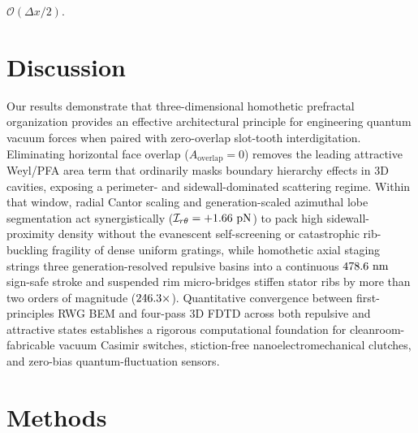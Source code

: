 \documentclass[pdflatex,sn-nature]{sn-jnl}
\begin{document}
$\mathcal{O}(\Delta x/2)$.

\section*{Discussion}
\label{sec:discussion}

Our results demonstrate that three-dimensional homothetic prefractal organization provides an effective architectural principle for engineering quantum vacuum forces when paired with zero-overlap slot-tooth interdigitation. Eliminating horizontal face overlap ($A_{\mathrm{overlap}}=0$) removes the leading attractive Weyl/PFA area term that ordinarily masks boundary hierarchy effects in 3D cavities\cite{kennethklich2006,lapidus1991}, exposing a perimeter- and sidewall-dominated scattering regime\cite{levin2010}. Within that window, radial Cantor scaling and generation-scaled azimuthal lobe segmentation act synergistically ($\mathcal{I}_{r\theta} = +1.66{}\ \mathrm{pN}$) to pack high sidewall-proximity density without the evanescent self-screening or catastrophic rib-buckling fragility of dense uniform gratings, while homothetic axial staging strings three generation-resolved repulsive basins into a continuous $478.6{}\ \mathrm{nm}$ sign-safe stroke and suspended rim micro-bridges stiffen stator ribs by more than two orders of magnitude ($246.3{}\times$). Quantitative convergence between first-principles RWG BEM and four-pass 3D FDTD across both repulsive and attractive states establishes a rigorous computational foundation for cleanroom-fabricable vacuum Casimir switches, stiction-free nanoelectromechanical clutches, and zero-bias quantum-fluctuation sensors\cite{safronova2018,lodahl2015}.

\backmatter

\section*{Methods}
\label{sec:methods}
\end{document}

